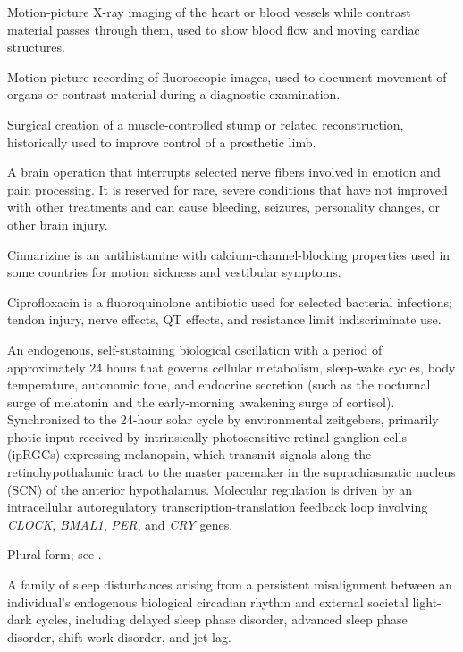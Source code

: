  Motion-picture X-ray imaging of the heart or blood vessels while contrast material passes through them, used to show blood flow and moving cardiac structures.

 Motion-picture recording of fluoroscopic images, used to document movement of organs or
contrast material during a diagnostic examination.

 Surgical creation of a muscle-controlled stump or related reconstruction, historically
used to improve control of a prosthetic limb.

 A brain operation that interrupts selected nerve fibers involved in emotion and pain processing. It is reserved for rare, severe conditions that have not improved with other treatments and can cause bleeding, seizures, personality changes, or other brain injury.

 Cinnarizine is an antihistamine with calcium-channel-blocking properties used in some countries for motion sickness and vestibular symptoms.

 Ciprofloxacin is a fluoroquinolone antibiotic used for selected bacterial infections; tendon injury, nerve effects, QT effects, and resistance limit indiscriminate use.

 An endogenous, self-sustaining biological oscillation with a period of approximately 24 hours that governs cellular metabolism, sleep-wake cycles, body temperature, autonomic tone, and endocrine secretion (such as the nocturnal surge of melatonin and the early-morning awakening surge of cortisol). Synchronized to the 24-hour solar cycle by environmental zeitgebers, primarily photic input received by intrinsically photosensitive retinal ganglion cells (ipRGCs) expressing melanopsin, which transmit signals along the retinohypothalamic tract to the master pacemaker in the suprachiasmatic nucleus (SCN) of the anterior hypothalamus. Molecular regulation is driven by an intracellular autoregulatory transcription-translation feedback loop involving \textit{CLOCK}, \textit{BMAL1}, \textit{PER}, and \textit{CRY} genes.

 Plural form; see .

 A family of sleep disturbances arising from a persistent misalignment between an individual's endogenous biological circadian rhythm and external societal light-dark cycles, including delayed sleep phase disorder, advanced sleep phase disorder, shift-work disorder, and jet lag.

